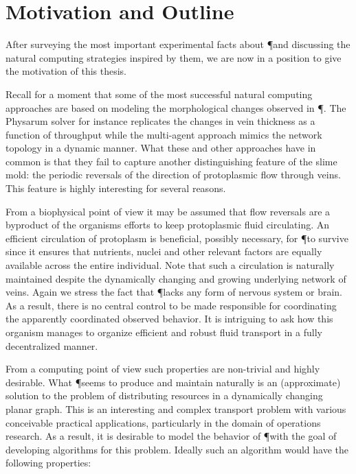 \section{Motivation and Outline}

	After surveying the most important experimental facts about \P and discussing the natural computing strategies inspired by them, we are now in a position to give the motivation of this thesis. 

	Recall for a moment that some of the most successful natural computing approaches are based on modeling the morphological changes observed in \P. The Physarum solver for instance replicates the changes in vein thickness as a function of throughput while the multi-agent approach mimics the network topology in a dynamic manner. What these and other approaches have in common is that they fail to capture another distinguishing feature of the slime mold: the periodic reversals of the direction of protoplasmic flow through veins. This feature is highly interesting for several reasons. 

	From a biophysical point of view it may be assumed that flow reversals are a byproduct of the organisms efforts to keep protoplasmic fluid circulating. An efficient circulation of protoplasm is beneficial, possibly necessary, for \P to survive since it ensures that nutrients, nuclei and other relevant factors are equally available across the entire individual. Note that such a circulation is naturally maintained despite the dynamically changing and growing underlying network of veins. Again we stress the fact that \P lacks any form of nervous system or brain. As a result, there is no central control to be made responsible for coordinating the apparently coordinated observed behavior. It is intriguing to ask how this organism manages to organize efficient and robust fluid transport in a fully decentralized manner.

	From a computing point of view such properties are non-trivial and highly desirable. What \P seems to produce and maintain naturally is an (approximate) solution to the problem of distributing resources in a dynamically changing planar graph. This is an interesting and complex transport problem with various conceivable practical applications, particularly in the domain of operations research. As a result, it is desirable to model the behavior of \P with the goal of developing algorithms for this problem. Ideally such an algorithm would have the following properties:

